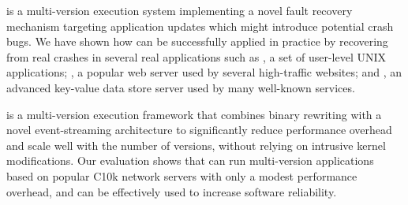 \mx is a multi-version execution system implementing a novel fault recovery
mechanism targeting application updates which might introduce potential crash
bugs. We have shown how \mx can be successfully applied in practice by
recovering from real crashes in several real applications such as \gnu
\coreutils, a set of user-level UNIX applications; \lighttpdgen, a popular web
server used by several high-traffic websites; and \redis, an advanced key-value
data store server used by many well-known services.

\varan is a multi-version execution framework that combines binary rewriting
with a novel event-streaming architecture to significantly reduce performance
overhead and scale well with the number of versions, without relying on
intrusive kernel modifications. Our evaluation shows that \varan can run
multi-version applications based on popular C10k network servers with only a
modest performance overhead, and can be effectively used to increase software
reliability.
